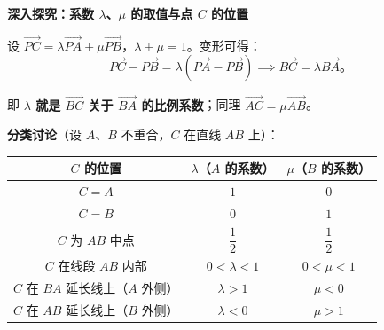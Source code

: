 \documentclass[UTF8,10pt,aspectratio=169]{ctexbeamer}
\begin{document}
	\begin{frame}
		\begin{center}
			{\Large \textbf{深入探究：系数 $\lambda$、$\mu$ 的取值与点 $C$ 的位置}}
		\end{center}
		\vspace{0.3cm}
		
		设 $\overrightarrow{PC} = \lambda \overrightarrow{PA} + \mu \overrightarrow{PB}$，$\lambda + \mu = 1$。变形可得：
		$$\overrightarrow{PC} - \overrightarrow{PB} = \lambda(\overrightarrow{PA} - \overrightarrow{PB}) \implies \overrightarrow{BC} = \lambda \overrightarrow{BA}。$$
		
		\vspace{0.2cm}
		即 \textbf{$\lambda$ 就是 $\overrightarrow{BC}$ 关于 $\overrightarrow{BA}$ 的比例系数}；同理 $\overrightarrow{AC} = \mu \overrightarrow{AB}$。
		
		\pause
		\vspace{0.3cm}
		\textbf{分类讨论}（设 $A$、$B$ 不重合，$C$ 在直线 $AB$ 上）：
		
		\vspace{0.2cm}
		\begin{center}
			\renewcommand{\arraystretch}{1.3}
			\begin{tabular}{|c|c|c|}
				\hline
				\textbf{$C$ 的位置} & \textbf{$\lambda$（$A$ 的系数）} & \textbf{$\mu$（$B$ 的系数）} \\
				\hline
				$C = A$ & $1$ & $0$ \\
				\hline
				$C = B$ & $0$ & $1$ \\
				\hline
				$C$ 为 $AB$ 中点 & $\dfrac{1}{2}$ & $\dfrac{1}{2}$ \\
				\hline
				$C$ 在线段 $AB$ 内部 & $0 < \lambda < 1$ & $0 < \mu < 1$ \\
				\hline
				$C$ 在 $BA$ 延长线上（$A$ 外侧） & $\lambda > 1$ & $\mu < 0$ \\
				\hline
				$C$ 在 $AB$ 延长线上（$B$ 外侧） & $\lambda < 0$ & $\mu > 1$ \\
				\hline
			\end{tabular}
		\end{center}
	\end{frame}
	
\end{document}
